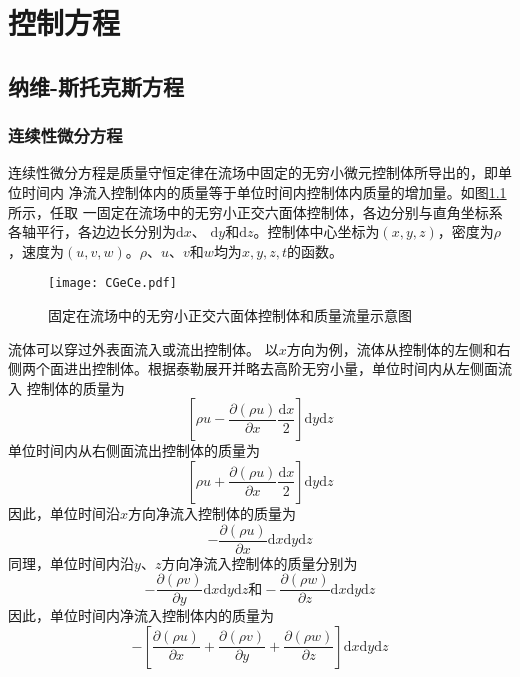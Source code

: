 \chapter{控制方程}
\section{纳维-斯托克斯方程}
\subsection{连续性微分方程}
连续性微分方程是质量守恒定律在流场中固定的无穷小微元控制体所导出的，即单位时间内
净流入控制体内的质量等于单位时间内控制体内质量的增加量。如图\ref{FgCGe_Ce}所示，任取
一固定在流场中的无穷小正交六面体控制体，各边分别与直角坐标系各轴平行，各边边长分别为$\mathrm{d}x$、
$\mathrm{d}y$和$\mathrm{d}z$。控制体中心坐标为$(x,y,z)$，密度为$\rho$
，速度为$(u,v,w)$。$\rho$、$u$、$v$和$w$均为$x,y,z,t$的函数。
\begin{figure}[h]
  \centering
  \texttt{[image: CGeCe.pdf]}
  \caption{固定在流场中的无穷小正交六面体控制体和质量流量示意图}
  \label{FgCGe_Ce}
\end{figure}

流体可以穿过外表面流入或流出控制体。
以$x$方向为例，流体从控制体的左侧和右侧两个面进出控制体。根据泰勒展开并略去高阶无穷小量，单位时间内从左侧面流入
控制体的质量为
\begin{equation*}
  \left[\rho u-\frac{\partial (\rho u)}{\partial x}\frac {\mathrm{d}x}{2}\right]\mathrm{d}y\mathrm{d}z
\end{equation*}
单位时间内从右侧面流出控制体的质量为
\begin{equation*}
  \left[\rho u+\frac{\partial (\rho u)}{\partial x}\frac {\mathrm{d}x}{2}\right]\mathrm{d}y\mathrm{d}z
\end{equation*}
因此，单位时间沿$x$方向净流入控制体的质量为
\begin{equation}
  -\frac{\partial (\rho u)}{\partial x}\mathrm{d}x\mathrm{d}y\mathrm{d}z
\end{equation}
同理，单位时间内沿$y$、$z$方向净流入控制体的质量分别为
\begin{equation*}
  -\frac{\partial (\rho v)}{\partial y}\mathrm{d}x\mathrm{d}y\mathrm{d}z
  \mbox{和}
  -\frac{\partial (\rho w)}{\partial z}\mathrm{d}x\mathrm{d}y\mathrm{d}z
\end{equation*}
因此，单位时间内净流入控制体内的质量为
\begin{equation}
  -\left[
    \frac {\partial (\rho u)} {\partial x}
    +
    \frac {\partial (\rho v)} {\partial y}
    +
    \frac {\partial (\rho w)} {\partial z}
    \right]
    \mathrm{d}x\mathrm{d}y\mathrm{d}z
\end{equation}

